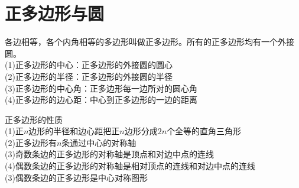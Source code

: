 \section{正多边形与圆}
\begin{theorem}
    各边相等，各个内角相等的多边形叫做正多边形。所有的正多边形均有一个外接圆。\\
    (1)正多边形的中心：正多边形的外接圆的圆心 \\
    (2)正多边形的半径：正多边形的外接圆的半径 \\
    (3)正多边形的中心角：正多边形每一边所对的圆心角 \\
    (4)正多边形的边心距：中心到正多边形的一边的距离
\end{theorem}
\begin{theorem}
    正多边形的性质 \\
    (1)正$n$边形的半径和边心距把正$n$边形分成$2n$个全等的直角三角形 \\
    (2)正多边形有$n$条通过中心的对称轴 \\
    (3)奇数条边的正多边形的对称轴是顶点和对边中点的连线 \\
    (4)偶数条边的正多边形的对称轴是相对顶点的连线和对边中点的连线 \\
    (3)偶数条边的正多边形是中心对称图形
\end{theorem}
\clearpage

